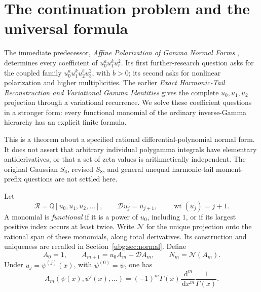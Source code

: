 \documentclass[11pt,letterpaper]{article}
\numberwithin{equation}{section}
\theoremstyle{definition}\newtheorem{definition}[theorem]{Definition}
\theoremstyle{remark}\newtheorem{remark}[theorem]{Remark}
\newcommand{\Q}{\mathbb Q}\newcommand{\C}{\mathbb C}\newcommand{\N}{\mathbb N}
\newcommand{\D}{\mathcal D}\newcommand{\NF}{\mathcal N}\newcommand{\HF}{\mathcal H}
\newcommand{\dd}{\,\mathrm d}\newcommand{\ii}{\mathrm i}
\begin{document}
\hypersetup{pageanchor=true}
{\small\setlength{\parskip}{0pt}\tableofcontents}
\clearpage{}

\section{The continuation problem and the universal formula}
\label{ubg:sec:main}

The immediate predecessor, \emph{Affine Polarization of Gamma Normal
Forms} \cite{Affine}, determines every coefficient of
$u_0^a u_1^k u_r^2$. Its first further-research question asks for the
coupled family $u_0^a u_1^k u_2^b u_3^2$, with $b>0$; its second asks for
nonlinear polarization and higher multiplicities. The earlier
\emph{Exact Harmonic-Tail Reconstruction and Variational Gamma Identities}
\cite{HTG} gives the complete $u_0,u_1,u_2$ projection through a
variational recurrence. We solve these coefficient questions in a
stronger form: every functional monomial of the ordinary inverse-Gamma
hierarchy has an explicit finite formula.

This is a theorem about a specified rational differential-polynomial
normal form. It does not assert that arbitrary individual polygamma
integrals have elementary antiderivatives, or that a set of zeta values
is arithmetically independent. The original Gaussian $S_6$, revised
$S_8$, and general unequal harmonic-tail moment-prefix questions are
not settled here.

Let
\begin{equation}\label{ubg:eq:ring}
 \mathscr R=\Q[u_0,u_1,u_2,\ldots],\qquad
 \D u_j=u_{j+1},\qquad \operatorname{wt}(u_j)=j+1.
\end{equation}
A monomial is \emph{functional} if it is a power of $u_0$, including $1$,
or if its largest positive index occurs at least twice. Write $\NF$
for the unique projection onto the rational span of these monomials,
along total derivatives. Its construction and uniqueness are recalled
in Section~\ref{ubg:sec:normal}. Define
\begin{equation}\label{ubg:eq:hierarchy}
 A_0=1,\qquad A_{m+1}=u_0A_m-\D A_m,\qquad N_m=\NF(A_m).
\end{equation}
Under $u_j=\psi^{(j)}(x)$, with $\psi^{(0)}=\psi$, one has
\begin{equation}\label{ubg:eq:Gamma-hierarchy}
 A_m(\psi(x),\psi'(x),\ldots)
   =(-1)^m\Gamma(x)\frac{\dd^m}{\dd x^m}\frac1{\Gamma(x)}.
\end{equation}
\end{document}
